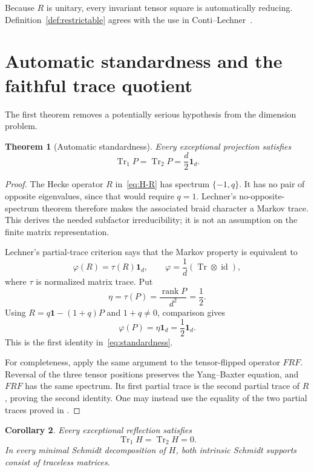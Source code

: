 \documentclass[11pt]{article}
\newtheorem{theorem}{Theorem}[section]
\newtheorem{corollary}[theorem]{Corollary}
\theoremstyle{definition}
\theoremstyle{remark}
\newcommand{\Id}{\mathbf 1}
\newcommand{\Tr}{\operatorname{Tr}}
\newcommand{\rank}{\operatorname{rank}}
\begin{document}
Because \(R\) is unitary, every invariant tensor square is automatically
reducing. Definition~\ref{def:restrictable} agrees with the use in
Conti--Lechner~\cite[\S6.1]{ContiLechner}.

\section{Automatic standardness and the faithful trace quotient}
\label{sec:standardness}

The first theorem removes a potentially serious hypothesis from the
dimension problem.

\begin{theorem}[Automatic standardness]\label{thm:standardness}
Every exceptional projection satisfies
\begin{equation}
  \Tr_1P=\Tr_2P=\frac d2\Id_d.
  \label{eq:standardness}
\end{equation}
\end{theorem}

\begin{proof}
The Hecke operator \(R\) in~\eqref{eq:H-R} has spectrum
\(\{-1,q\}\). It has no pair of opposite eigenvalues, since that would
require \(q=1\). Lechner's no-opposite-spectrum theorem
\cite[Proposition 2.4 and Lemma 3.1]{Lechner2026} therefore makes the
associated braid character a Markov trace. This derives the needed
subfactor irreducibility; it is not an assumption on the finite matrix
representation.

Lechner's partial-trace criterion
\cite[Proposition 2.3]{Lechner2026} says that the Markov property is
equivalent to
\[
  \varphi(R)=\tau(R)\Id_d,\qquad
  \varphi=\frac1d(\Tr\otimes\operatorname{id}),
\]
where \(\tau\) is normalized matrix trace. Put
\[
  \eta=\tau(P)=\frac{\rank P}{d^2}=\frac12.
\]
Using \(R=q\Id-(1+q)P\) and \(1+q\ne0\), comparison gives
\[
  \varphi(P)=\eta\Id_d=\frac12\Id_d.
\]
This is the first identity in~\eqref{eq:standardness}.

For completeness, apply the same argument to the tensor-flipped operator
\(FRF\). Reversal of the three tensor positions preserves the Yang--Baxter
equation, and \(FRF\) has the same spectrum. Its first partial trace is the
second partial trace of \(R\), proving the second identity. One may instead
use the equality of the two partial traces proved in
\cite[Theorem 5.10]{ContiLechner}.
\end{proof}

\begin{corollary}\label{cor:zero-marginals}
Every exceptional reflection satisfies
\[
  \Tr_1H=\Tr_2H=0.
\]
In every minimal Schmidt decomposition of \(H\), both intrinsic Schmidt
supports consist of traceless matrices.
\end{corollary}
\end{document}
